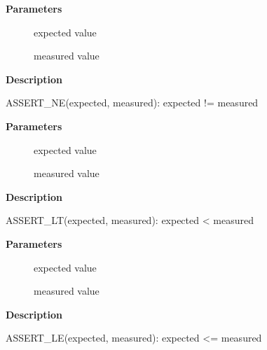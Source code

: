 \documentclass[a4paper,8pt,english]{sphinxmanual}
\begin{document}
\textbf{Parameters}
\begin{description}
\item[{}] \leavevmode
expected value

\item[{}] \leavevmode
measured value

\end{description}

\textbf{Description}

ASSERT\_NE(expected, measured): expected != measured

\begin{fulllineitems}
\label{dev-tools/kselftest:c.ASSERT_LT}
\end{fulllineitems}


\textbf{Parameters}
\begin{description}
\item[{}] \leavevmode
expected value

\item[{}] \leavevmode
measured value

\end{description}

\textbf{Description}

ASSERT\_LT(expected, measured): expected \textless{} measured

\begin{fulllineitems}
\label{dev-tools/kselftest:c.ASSERT_LE}
\end{fulllineitems}


\textbf{Parameters}
\begin{description}
\item[{}] \leavevmode
expected value

\item[{}] \leavevmode
measured value

\end{description}

\textbf{Description}

ASSERT\_LE(expected, measured): expected \textless{}= measured

\begin{fulllineitems}
\label{dev-tools/kselftest:c.ASSERT_GT}
\end{fulllineitems}
\end{document}
